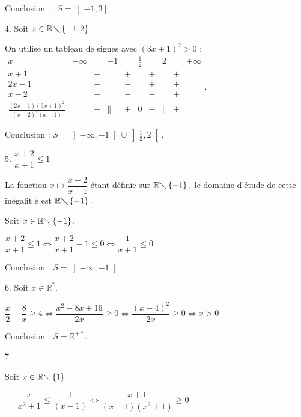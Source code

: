 \documentclass{article}
\begin{document}
Conclusion \ : $S=\left] -1,3\right] $

4. Soit $x\in 
\mathbb{R}
\diagdown \left\{ -1,2\right\} .$

On utilise un tableau de signes avec $(3x+1)^{2}>0$ : $%
\begin{array}{cccccccccc}
x & -\infty &  & -1 &  & \frac{1}{2} &  & 2 &  & +\infty \\ 
x+1 &  & - &  & + &  & + &  & + &  \\ 
2x-1 &  & - &  & - &  & + &  & + &  \\ 
x-2 &  & - &  & - &  & - &  & + &  \\ 
\frac{(2x-1)(3x+1)^{2}}{(x-2)^{5}(x+1)} &  & - & \parallel & + & 0 & - & 
\parallel & + & 
\end{array}%
.$

Conclusion : $S=\left] -\infty ,-1\right[ \cup \left] \frac{1}{2},2\right[ .$

5. $\dfrac{x+2}{x+1}\leq 1$ \ 

La fonction $x\mapsto \dfrac{x+2}{x+1}$ \'{e}tant d\'{e}finie sur $%
\mathbb{R}
\diagdown \left\{ -1\right\} ,$ le domaine d'\'{e}tude de cette in\'{e}galit%
\'{e} est $%
\mathbb{R}
\diagdown \left\{ -1\right\} .$

Soit $x\in 
\mathbb{R}
\diagdown \left\{ -1\right\} .$

$\dfrac{x+2}{x+1}\leq 1\Leftrightarrow \dfrac{x+2}{x+1}-1\leq
0\Leftrightarrow \dfrac{1}{x+1}\leq 0$

Conclusion : $S=\left] -\infty ;-1\right[ $

6. Soit $x\in 
\mathbb{R}
^{\ast }.$

$\dfrac{x}{2}+\dfrac{8}{x}\geqslant 4\Leftrightarrow \dfrac{x^{2}-8x+16}{2x}%
\geq 0\Leftrightarrow \dfrac{\left( x-4\right) ^{2}}{2x}\geq
0\Leftrightarrow x>0$

Conclusion : $S=%
\mathbb{R}
^{+\ast }.$

7 .

Soit $x\in 
\mathbb{R}
\diagdown \left\{ 1\right\} .$

\ \ \ $\dfrac{x}{x^{2}+1}\leqslant \dfrac{1}{(x-1)}\Leftrightarrow \dfrac{x+1%
}{\left( x-1\right) \left( x^{2}+1\right) }\geq 0$
\end{document}
